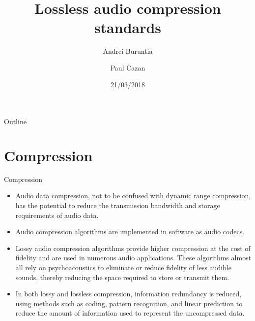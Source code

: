 \documentclass{beamer}
\title{Lossless audio compression standards}
\author{Andrei Buruntia \and Paul Cazan}
\date{21/03/2018}
\begin{document}
\begin{frame}
  \titlepage
\end{frame}

\begin{frame}{Outline}
  \tableofcontents
\end{frame}

\section{Compression}
\begin{frame}{Compression}
	\begin{itemize}[<+->]
	\item{
		Audio data compression, not to be confused with dynamic range compression, has the potential to reduce the transmission bandwidth and storage requirements of audio data.
		}
	\item{
		 Audio compression algorithms are implemented in software as audio codecs.
	}
	\item{
		 Lossy audio compression algorithms provide higher compression at the cost of fidelity and are used in numerous audio applications. These algorithms almost all rely on psychoacoustics to eliminate or reduce fidelity of less audible sounds, thereby reducing the space required to store or transmit them.
	}
	\item{
		In both lossy and lossless compression, information redundancy is reduced, using methods such as coding, pattern recognition, and linear prediction to reduce the amount of information used to represent the uncompressed data.
	}
	\end{itemize}
\end{frame}
\end{document}
